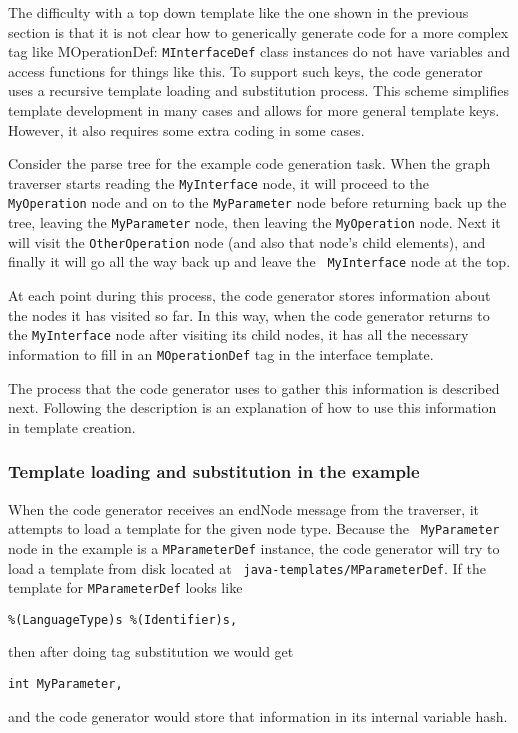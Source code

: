 The difficulty with a top down template like the one shown in the previous
section is that it is not clear how to generically generate code for a more
complex tag like {\sf MOperationDef}: {\tt MInterfaceDef} class instances do not
have variables and access functions for things like this. To support such keys,
the code generator uses a recursive template loading and substitution process.
This scheme simplifies template development in many cases and allows for more
general template keys. However, it also requires some extra coding in some
cases.

Consider the parse tree for the example code generation task. When the graph
traverser starts reading the {\tt MyInterface} node, it will proceed to the {\tt
MyOperation} node and on to the {\tt MyParameter} node before returning back up
the tree, leaving the {\tt MyParameter} node, then leaving the {\tt MyOperation}
node. Next it will visit the {\tt OtherOperation} node (and also that node's
child elements), and finally it will go all the way back up and leave the {\tt
MyInterface} node at the top.

At each point during this process, the code generator stores information about
the nodes it has visited so far. In this way, when the code generator returns to
the {\tt MyInterface} node after visiting its child nodes, it has all the
necessary information to fill in an {\tt MOperationDef} tag in the interface
template.

The process that the code generator uses to gather this information is described
next. Following the description is an explanation of how to use this information
in template creation.

\subsubsection{Template loading and substitution in the example}

When the code generator receives an endNode message from the traverser, it
attempts to load a template for the given node type. Because the {\tt
MyParameter} node in the example is a {\tt MParameterDef} instance, the code
generator will try to load a template from disk located at {\tt
java-templates/MParameterDef}. If the template for {\tt MParameterDef} looks
like
\begin{verbatim}
%(LanguageType)s %(Identifier)s,
\end{verbatim}
then after doing tag substitution we would get
\begin{verbatim}
int MyParameter,
\end{verbatim}
and the code generator would store that information in its internal variable
hash.

